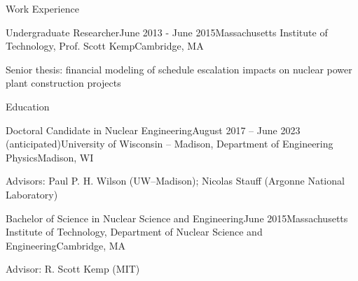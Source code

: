 \documentclass{resume} %
\begin{document}
\begin{rSection}{Work Experience}

\begin{rSubsection}{Undergraduate Researcher}{June 2013 - June 2015}{Massachusetts Institute of Technology, Prof. Scott Kemp}{Cambridge, MA}
  \setlength{\itemsep}{-3pt}
  \item Senior thesis: financial modeling of schedule escalation impacts on nuclear power plant construction projects
\end{rSubsection}

\end{rSection}



\begin{rSection}{Education}

\begin{rSubsection}{Doctoral Candidate in Nuclear Engineering}{August 2017 -- June 2023 (anticipated)}{University of Wisconsin -- Madison, Department of Engineering Physics}{Madison, WI}
  \item Advisors: Paul P. H. Wilson (UW--Madison); Nicolas Stauff (Argonne National Laboratory)
\end{rSubsection}

\begin{rSubsection}{Bachelor of Science in Nuclear Science and Engineering}{June 2015}{Massachusetts Institute of Technology, Department of Nuclear Science and Engineering}{Cambridge, MA}
  \item Advisor: R. Scott Kemp (MIT)
\end{rSubsection}

\end{rSection}







\end{document}
